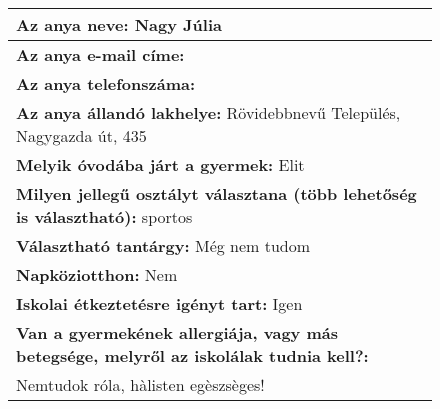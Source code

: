 \documentclass[10pt,a4paper]{article}
\begin{document}
\begin{figure}[!ht]
\begin{tabular}{|m{\textwidth}|}
\hline\vspace{3pt}
\textbf{Az anya neve:} \hspace{0.5cm} Nagy Júlia \vspace{3pt} \\
\hline\vspace{3pt}
\textbf{Az anya e-mail címe:} \hspace{0.5cm}   \vspace{3pt} \\
\hline\vspace{3pt}
\textbf{Az anya telefonszáma:} \hspace{0.5cm}  \vspace{3pt} \\
\hline\vspace{3pt}
\textbf{Az anya állandó lakhelye:} \hspace{0.5cm} Rövidebbnevű Település, Nagygazda út, 435 \vspace{3pt} \\
\hline\vspace{3pt}
\textbf{Melyik óvodába járt a gyermek:} \hspace{0.5cm} Elit \vspace{3pt} \\
\hline\vspace{3pt}
\textbf{Milyen jellegű osztályt választana (több lehetőség is választható):} \hspace{0.5cm} sportos \vspace{3pt} \\
\hline\vspace{3pt}
\textbf{Választható tantárgy:} \hspace{0.5cm} Még nem tudom \vspace{3pt} \\
\hline\vspace{3pt}
\textbf{Napköziotthon:} \hspace{0.5cm} Nem \vspace{3pt} \\
\hline\vspace{3pt}
\textbf{Iskolai étkeztetésre igényt tart:} \hspace{0.5cm} Igen \vspace{3pt} \\
\hline\vspace{3pt}
\textbf{Van a gyermekének allergiája, vagy más betegsége, melyről az iskolálak tudnia kell?:} \\ \hspace{0.5cm} Nemtudok róla, hàlisten egèszsèges! \vspace{3pt} \\

\end{tabular}
\end{figure}
\end{document}
